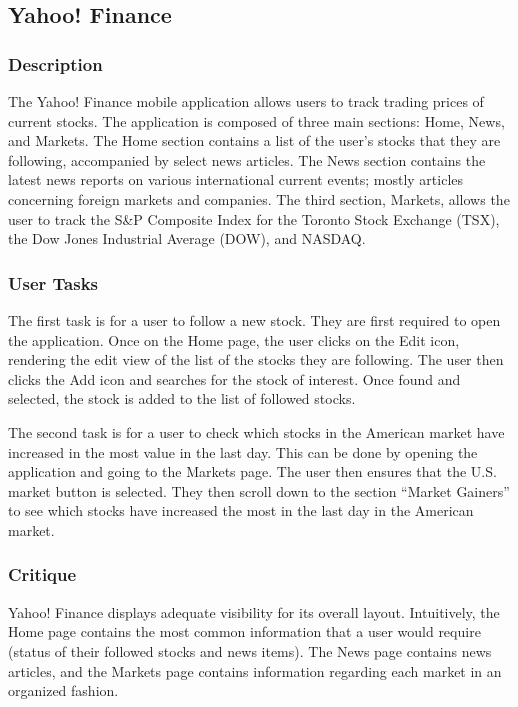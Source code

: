 \documentclass{sigchi}
\begin{document}
\subsection{Yahoo! Finance}
\subsubsection{Description}
The Yahoo! Finance mobile application allows users to track trading prices of current stocks. The application is composed of three main sections: Home, News, and Markets. The Home section contains a list of the user's stocks that they are following, accompanied by select news articles. The News section contains the latest news reports on various international current events; mostly articles concerning foreign markets and companies. The third section, Markets, allows the user to track the S\&P Composite Index for the Toronto Stock Exchange (TSX), the Dow Jones Industrial Average (DOW), and NASDAQ. 

\subsubsection{User Tasks}
The first task is for a user to follow a new stock. They are first required to open the application. Once on the Home page, the user clicks on the Edit icon, rendering the edit view of the list of the stocks they are following. The user then clicks the Add icon and searches for the stock of interest. Once found and selected, the stock is added to the list of followed stocks.\par

The second task is for a user to check which stocks in the American market have increased in the most value in the last day. This can be done by opening the application and going to the Markets page. The user then ensures that the U.S. market button is selected. They then scroll down to the section ``Market Gainers'' to see which stocks have increased the most in the last day in the American market.

\subsubsection{Critique}
Yahoo! Finance displays adequate visibility for its overall layout. Intuitively, the Home page contains the most common information that a user would require (status of their followed stocks and news items). The News page contains news articles, and the Markets page contains information regarding each market in an organized fashion. \par
\end{document}
